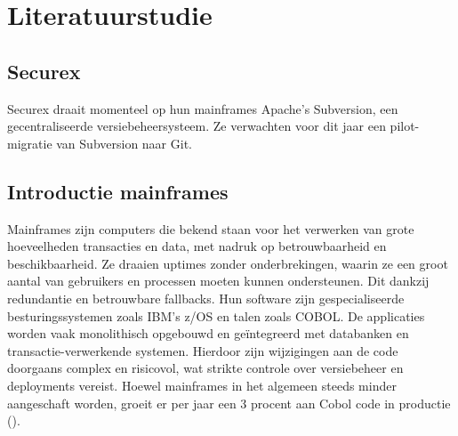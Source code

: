 




\section{Literatuurstudie}%
\label{sec:literatuurstudie}

\subsection{Securex}
Securex draait momenteel op hun mainframes Apache's Subversion, een gecentraliseerde versiebeheersysteem. Ze verwachten voor dit jaar een pilot-migratie van Subversion naar Git. 

\subsection{Introductie mainframes}
Mainframes zijn computers die bekend staan voor het verwerken van grote hoeveelheden transacties en data, met nadruk op betrouwbaarheid en beschikbaarheid. Ze draaien uptimes zonder onderbrekingen, waarin ze een groot aantal van gebruikers en processen moeten kunnen ondersteunen. Dit dankzij redundantie en betrouwbare fallbacks. Hun software zijn gespecialiseerde besturingssystemen zoals IBM's z/OS en talen zoals COBOL. De applicaties worden vaak monolithisch opgebouwd en geïntegreerd met databanken en transactie-verwerkende systemen. Hierdoor zijn wijzigingen aan de code doorgaans complex en risicovol, wat strikte controle over versiebeheer en deployments vereist.
Hoewel mainframes in het algemeen steeds minder aangeschaft worden, groeit er per jaar een 3 procent aan Cobol code in productie (\cite{Barnett2005}).

